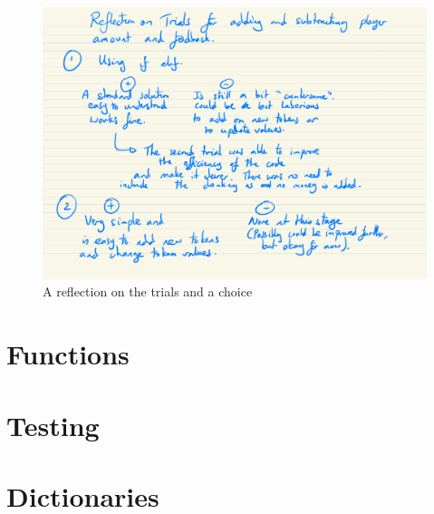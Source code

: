 \documentclass[a4paper,12pt]{article}
\begin{document}
\newpage

\begin{figure} [!h]
	\centering
	\includegraphics[width=15cm]{iterative_processes/Lucky_Unicorn_Sub_problems_3_a.pdf}
	\caption*{A reflection on the trials and a choice}
\end{figure}

\newpage

\newpage

\section{Functions}


\newpage
\section{Testing}
\newpage
\section{Dictionaries}





\newpage
\end{document}
